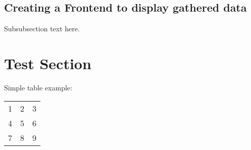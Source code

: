 \documentclass[conference]{IEEEtran}
\begin{document}
\subsection{Creating a Frontend to display gathered data}
Subsubsection text here.

\section{Test Section}

Simple table example:
\begin{tabular}{ c | c | c }
	\hline			
	1 & 2 & 3 \\
	4 & 5 & 6 \\
	7 & 8 & 9 \\
	\hline  
\end{tabular}

%
%



%
%
\end{document}
